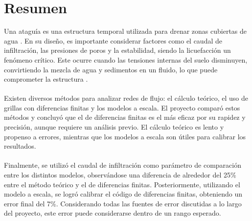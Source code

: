 \section*{Resumen}
Una ataguía es una estructura temporal utilizada para drenar zonas cubiertas de agua \textbf{\cite{madanayaka2018}}. En su diseño, es importante considerar factores como el caudal de infiltración, las presiones de poros y la estabilidad, siendo la licuefacción un fenómeno crítico. Este ocurre cuando las tensiones internas del suelo disminuyen, convirtiendo la mezcla de agua y sedimentos en un fluido, lo que puede comprometer la estructura \textbf{\cite{sumer2009}}.
\\ \\
Existen diversos métodos para analizar redes de flujo: el cálculo teórico, el uso de grillas con diferencias finitas y los modelos a escala. El proyecto comparó estos métodos y concluyó que el de diferencias finitas es el más eficaz por su rapidez y precisión, aunque requiere un análisis previo. El cálculo teórico es lento y propenso a errores, mientras que los modelos a escala son útiles para calibrar los resultados.
\\ \\
Finalmente, se utilizó el caudal de infiltración como parámetro de comparación entre los distintos modelos, observándose una diferencia de alrededor del 25\% entre el método teórico y el de diferencias finitas. Posteriormente, utilizando el modelo a escala, se logró calibrar el código de diferencias finitas, obteniendo un error final del 7\%. Considerando todas las fuentes de error discutidas a lo largo del proyecto, este error puede considerarse dentro de un rango esperado.
